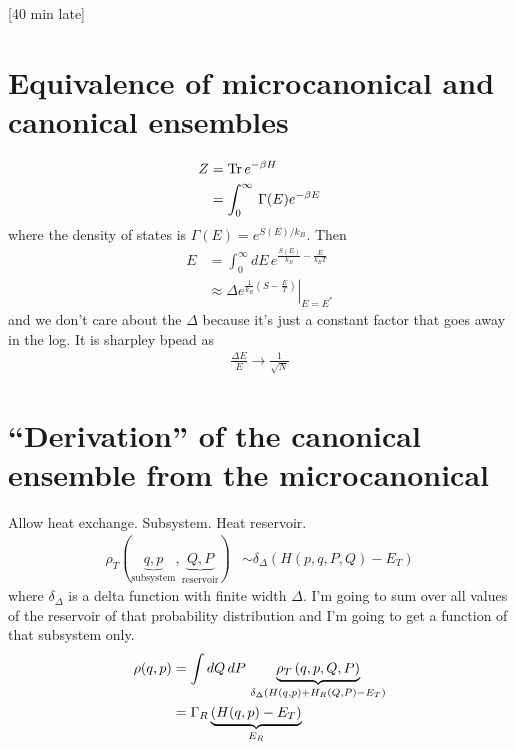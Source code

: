 [40 min late]

\section{Equivalence of microcanonical and canonical ensembles}
\begin{align}
    Z &= \Tr e^{-\beta H}\\
    &=
    \int_{0}^{\infty}\, \Gamma(E) e^{-\beta E}
\end{align}
where the density of states is $\Gamma(E)=e^{S(E)/k_B}$.
Then
\begin{align}
    E &=
    \int_{0}^{\infty} dE\,
    e^{\frac{S(E)}{k_B} - \frac{E}{k_B T}}\\
    &\approx 
    \left. \Delta e^{\frac{1}{k_B}\left( S - \frac{E}{T} \right)}
    \right|_{E = E^*}
\end{align}
and we don't care about the $\Delta$ because it's just a constant factor that
goes away in the log.
It is sharpley bpead as
\begin{align}
    \frac{\Delta E}{E} \to \frac{1}{\sqrt{N}}
\end{align}


\section{``Derivation'' of the canonical ensemble from the microcanonical}
Allow heat exchange.
Subsystem.
Heat reservoir.
\begin{align}
    \rho_T (\underbrace{q, p}_{\text{subsystem}}, \underbrace{Q,
    P}_{\text{reservoir}}) &\sim
    \delta_\Delta\left( 
    H(p,q,P,Q) - E_T
    \right)
\end{align}
where $\delta_\Delta$ is a delta function with finite width $\Delta$.
I'm going to sum over all values of the reservoir of that probability
distribution and I'm going to get a function of that subsystem only.
\begin{align}
    \rho(q, p) &=
    \int dQ\, dP\,
    \underbrace{\rho_T\left( q, p, Q, P \right)}_{%
    \delta_\Delta\left( H(q, p) + H_R(Q,P) - E_T \right)
    }\\
    &= \Gamma_R\underbrace{\left( H(q,p) - E_T \right)}_{E_R}
\end{align}
